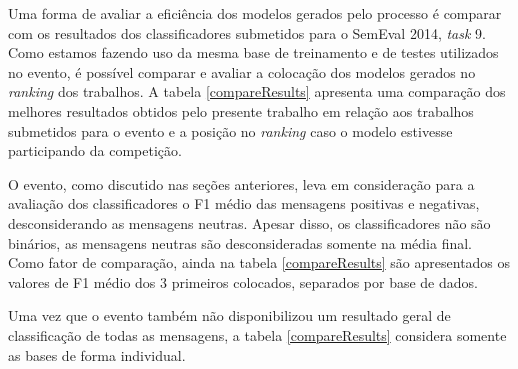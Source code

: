 \documentclass[12pt]{article}
\begin{document}
Uma forma de avaliar a eficiência dos modelos gerados pelo processo é comparar com os resultados dos classificadores submetidos para o SemEval 2014, \emph{task} 9. Como estamos fazendo uso da mesma base de treinamento e de testes utilizados no evento, é possível comparar e avaliar a colocação dos modelos gerados no \emph{ranking} dos trabalhos. A tabela \ref{compareResults} apresenta uma comparação dos melhores resultados obtidos pelo presente trabalho em relação aos trabalhos submetidos para o evento e a posição no \emph{ranking} caso o modelo estivesse participando da competição.

O evento, como discutido nas seções anteriores, leva em consideração para a avaliação dos classificadores o F1 médio das mensagens positivas e negativas, desconsiderando as mensagens neutras. Apesar disso, os classificadores não são binários, as mensagens neutras são desconsideradas somente na média final. Como fator de comparação, ainda na tabela \ref{compareResults} são apresentados os valores de F1 médio dos 3 primeiros colocados, separados por base de dados.

Uma vez que o evento também não disponibilizou um resultado geral de classificação de todas as mensagens, a tabela \ref{compareResults} considera somente as bases de forma individual.
\end{document}
